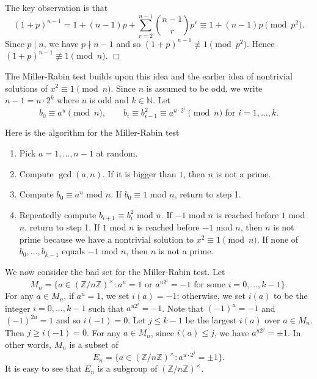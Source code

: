\documentclass{article}
\def\Z{{\mathbb Z}}
\def\N{{\mathbb N}}
\def\Z{{\mathbb Z}}
\newenvironment{proof}{\noindent {\bf Proof:}}{$\Box$ \vspace{2 ex}}
\begin{document}
\begin{proof}
    The key observation is that $$(1 + p)^{n-1} = 1 + (n-1)p + \sum_{r=2}^{n-1}\binom{n-1}{r}p^r\equiv 1 + (n-1)p\pmod{p^2}.$$
    Since $p\mid n$, we have $p\nmid n-1$ and so $(1+p)^{n-1}\not\equiv 1\pmod{p^2}$. Hence $(1+p)^{n-1}\not\equiv 1\pmod{n}$.
\end{proof}

The Miller-Rabin test builds upon this idea and the earlier idea of nontrivial solutions of $x^2\equiv 1\pmod{n}$. Since $n$ is assumed to be odd, we write $n - 1 = u\cdot 2^k$ where $u$ is odd and $k\in\N$. Let $$b_0\equiv a^u\pmod{n}, \qquad b_i\equiv b_{i-1}^2\equiv a^{u\cdot 2^{i}}\pmod{n}\mbox{ for }i = 1,\ldots,k.$$

Here is the algorithm for the Miller-Rabin test
\begin{enumerate}
    \item Pick $a = 1,\ldots,n-1$ at random.
    \item Compute $\gcd(a,n)$. If it is bigger than $1$, then $n$ is not a prime.
    \item Compute $b_0\equiv a^u$ mod $n$. If $b_0\equiv 1$ mod $n$, return to step 1.
    \item Repeatedly compute $b_{i+1}\equiv b_i^2$ mod $n$. If $-1$ mod $n$ is reached before $1$ mod $n$, return to step 1. If $1$ mod $n$ is reached before $-1$ mod $n$, then $n$ is not prime because we have a nontrivial solution to $x^2\equiv 1\pmod{n}$. If none of $b_0,\ldots, b_{k-1}$ equals $-1$ mod $n$, then $n$ is not a prime.
\end{enumerate}
We now consider the bad set for the Miller-Rabin test. Let 
$$M_n = \{a\in(\Z/n\Z)^\times\colon a^u = 1\mbox{ or }a^{u2^i} = -1\mbox{ for some }i=0,\ldots,k-1\}.$$
For any $a\in M_n$, if $a^u = 1$, we set $i(a) = -1$; otherwise, we set $i(a)$ to be the integer $i = 0,\ldots,k-1$ such that $a^{u2^i} = -1$. Note that $(-1)^u = -1$ and $(-1)^{2u} = 1$ and so $i(-1) = 0$. Let $j\leq k-1$ be the largest $i(a)$ over $a\in M_n$. Then $j\geq i(-1) = 0$. For any $a\in M_n$, since $i(a)\leq j$, we have $a^{u2^j} = \pm 1$. In other words, $M_n$ is a subset of
$$E_n = \{a\in (\Z/n\Z)^\times\colon a^{u\cdot2^j} = \pm 1\}.$$ 
It is easy to see that $E_n$ is a subgroup of $(\Z/n\Z)^\times$.
\end{document}
